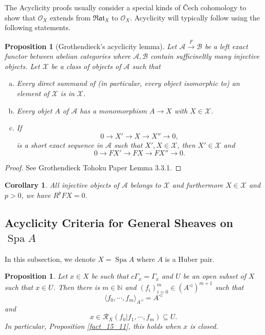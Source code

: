 \documentclass[8pt]{article}
\numberwithin{equation}{section}
\newtheorem{proposition}{Proposition}[subsection]
\newtheorem*{proposition*}{Proposition}
\newtheorem*{corollary*}{Corollary}
\DeclareMathOperator{\Spa}{Spa}
\newcommand{\Ouv}{\mathscr{O}}
\newcommand{\N}[0]{\mathbb{N}}
\newcommand{\cR}[0]{\mathcal{R}}
\newcommand{\cGamma}[0]{c\Gamma}
\newcommand{\sA}[0]{\mathscr{A}}
\newcommand{\sX}[0]{\mathscr{X}}
\newcommand{\cO}[0]{\mathcal{O}}
\newcommand{\Rat}[0]{\mathfrak{Rat}}
\begin{document}
The Acyclicity proofs usually consider a special kinds of Čech cohomology to show that $\cO_X$ extends from $\Rat_X$ to $\Ouv_X$. Acyclicity will typically follow using the following statements.
\begin{proposition*}[Grothendieck's acyclicity lemma]
    Let $\mathscr{A}\stackrel{F}{\to}\mathscr{B}$ be a left exact functor between abelian categories where $\mathscr{A},\mathscr{B}$ contain sufficineltly many injective objects. Let $\mathscr{X}$ be a class of objects of $\mathscr{A}$
    such that 
    \begin{enumerate}[a.]
        \item Every direct summand of (in particular, every object isomorphic to) an element of $\mathscr{X}$ is in $\mathscr{X}$.
        \item Every objet $A$ of $\mathscr{A}$ has a monomorphism $A\to X$ with $X\in\mathscr{X}$.
        \item If 
        \begin{equation*}
            0\to X'\to X\to X''\to 0,
        \end{equation*}
         is a short exact sequence in $\mathscr{A}$ such that $X',X\in\mathscr{X}$, then $X'\in\mathscr{X}$ and 
        \begin{equation*}
            0\to FX'\to FX\to FX''\to 0.
        \end{equation*}
    \end{enumerate}
\end{proposition*}
\begin{proof}
    See Grothendieck Tohoku Paper Lemma 3.3.1.
\end{proof}

\begin{corollary*}
    All injective objects of $\sA$ belongs to $\sX$ and furthermore $X\in\sX$ and $p>0$, we have $R^pFX = 0$.
\end{corollary*}

\subsection{Acyclicity Criteria for General Sheaves on $\Spa A$}

In this subsection, we denote $X=\Spa A$ where $A$ is a Huber pair.

\begin{proposition}
    \label{proposition_23_1}
    Let $x\in X$ be such that $\cGamma_x = \Gamma_x$ and $U$ be an open subset of $X$ such that $x\in U$. Then there is $m\in\N$ and $(f_i)_{i=0}^m\in(A^\triangleleft)^{m+1}$ such that 
    \begin{equation*}
        \langle f_0,\cdots,f_m\rangle_{A^\triangleleft} = A^\triangleleft
    \end{equation*}
    and 
    \begin{equation*}
        x\in\cR_X(f_0|f_1,\cdots,f_m)\subseteq U.
    \end{equation*}
    In particular, Proposition \ref{fact_15_11}, this holds when $x$ is closed.
\end{proposition}
\end{document}
